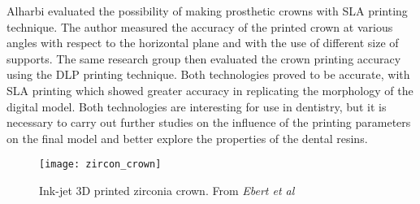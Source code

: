 Alharbi \parencite{Reference101} evaluated the possibility of making prosthetic crowns with SLA printing technique. The author measured the accuracy of the printed crown at various angles with respect to the horizontal plane and with the use of different size of supports. The same research group then evaluated the crown printing accuracy using the DLP \parencite{Reference102} printing technique. Both technologies proved to be accurate, with SLA printing which showed greater accuracy in replicating the morphology of the digital model. Both technologies are interesting for use in dentistry, but it is necessary to carry out further studies on the influence of the printing parameters on the final model and better explore the properties of the dental resins.
\begin{wrapfigure} {R} {0.4\textwidth}
\vspace{-20pt}
	\begin{center}
	\texttt{[image: zircon\_crown]}
    \caption{Ink-jet 3D printed zirconia crown. From \emph{Ebert et al} \parencite{Reference106}}
    \label{fig:zircon_crown}
    \end{center}
\vspace{-20pt}
\end{wrapfigure}

